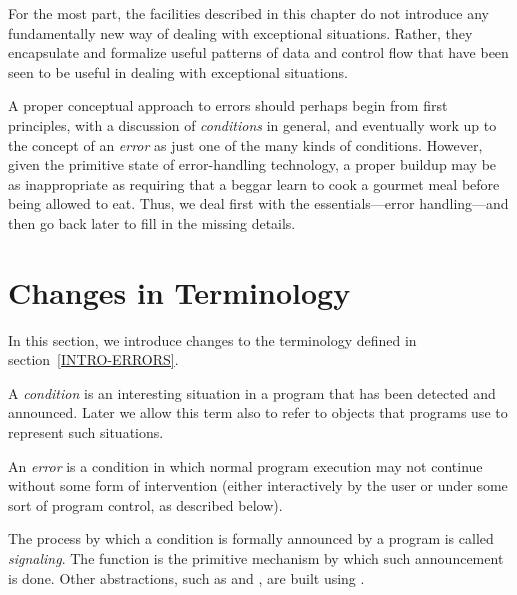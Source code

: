 For the most part, the facilities described in this chapter do not introduce
any fundamentally new way of dealing with exceptional situations. Rather, they
encapsulate and formalize useful patterns of data and control flow that have
been seen to be useful in dealing with exceptional situations.

A proper conceptual approach to errors should perhaps begin from first
principles, with a discussion of \emph{conditions} in general, and eventually work
up to the concept of an \emph{error} as just one of the many kinds of
conditions. However, given the primitive state of error-handling
technology, a proper buildup may be as inappropriate as requiring that a
beggar learn to cook a gourmet meal before being allowed to eat.  Thus,
we deal first with the essentials---error handling---and then
go back later to fill in the missing details.

\section{Changes in Terminology}

In this section, we introduce changes to the terminology
defined in section~\ref{INTRO-ERRORS}.

A \emph{condition} is an interesting situation in a program that has been
detected and announced. Later we allow this term also to refer to
objects that programs use to represent such situations.

An \emph{error} is a condition in which normal program execution may not
continue without some form of intervention (either interactively by the user
or under some sort of program control, as described below).

The process by which a condition is formally announced by a program is called
\emph{signaling}. The function  is the primitive mechanism by which such
announcement is done. Other abstractions, such as  and , are built
using .

